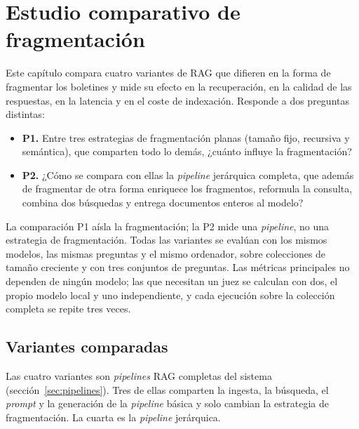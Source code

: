 \chapter{Estudio comparativo de fragmentación}
\label{cap:estudio-chunking}

Este capítulo compara cuatro variantes de RAG que difieren en la forma de fragmentar los boletines y mide su efecto en la recuperación, en la calidad de las respuestas, en la latencia y en el coste de indexación. Responde a dos preguntas distintas:

\begin{itemize}
  \item \textbf{P1.} Entre tres estrategias de fragmentación planas (tamaño fijo, recursiva y semántica), que comparten todo lo demás, ¿cuánto influye la fragmentación?
  \item \textbf{P2.} ¿Cómo se compara con ellas la \emph{pipeline} jerárquica completa, que además de fragmentar de otra forma enriquece los fragmentos, reformula la consulta, combina dos búsquedas y entrega documentos enteros al modelo?
\end{itemize}

La comparación P1 aísla la fragmentación; la P2 mide una \emph{pipeline}, no una estrategia de fragmentación. Todas las variantes se evalúan con los mismos modelos, las mismas preguntas y el mismo ordenador, sobre colecciones de tamaño creciente y con tres conjuntos de preguntas. Las métricas principales no dependen de ningún modelo; las que necesitan un juez se calculan con dos, el propio modelo local y uno independiente, y cada ejecución sobre la colección completa se repite tres veces.

\section{Variantes comparadas}
\label{sec:estrategias}

Las cuatro variantes son \emph{pipelines} RAG completas del sistema (sección~\ref{sec:pipelines}). Tres de ellas comparten la ingesta, la búsqueda, el \emph{prompt} y la generación de la \emph{pipeline} básica y solo cambian la estrategia de fragmentación. La cuarta es la \emph{pipeline} jerárquica.

